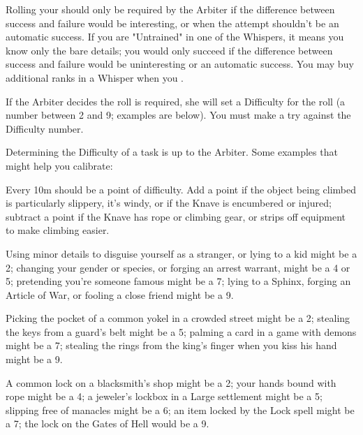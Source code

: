     Rolling your \KNAVE should only be required by the Arbiter if the difference between success and failure would be interesting, or when the attempt shouldn't be an automatic success.  If you are "Untrained" in one of the Whispers, it means you know only the bare details; you would only succeed if the difference between success and failure would be uninteresting or an automatic success. You may buy additional ranks in a Whisper when you .


 If the Arbiter decides the roll is required, she will set a Difficulty for the roll (a number between 2 and 9; examples are below). You must make a \RB{\KNAVE} try against the Difficulty number.

 Determining the Difficulty of a task is up to the Arbiter. Some examples that might help you calibrate:


   Every 10m should be a point of difficulty.  Add a point if the object being climbed is particularly slippery, it's windy, or if the Knave is encumbered or injured; subtract a point if the Knave has rope or climbing gear, or strips off equipment to make climbing easier. 

      Using minor details to disguise yourself as a stranger, or lying to a kid might be a 2; changing your gender or species, or forging an arrest warrant, might be a 4 or 5; pretending you're someone famous might be a 7; lying to a Sphinx, forging an Article of War, or fooling a close friend might be a 9. 

     Picking the pocket of a common yokel in a crowded street might be a 2; stealing the keys from a guard's belt might be a 5; palming a card in a game with demons might be a 7; stealing the rings from the king's finger when you kiss his hand might be a 9. 

       A common lock on a blacksmith's shop might be a 2; your hands bound with rope might be a 4; a jeweler's lockbox in a Large settlement might be a 5; slipping free of manacles might be a 6;  an item locked by the Lock spell might be a 7; the lock on the Gates of Hell would be a 9. 

